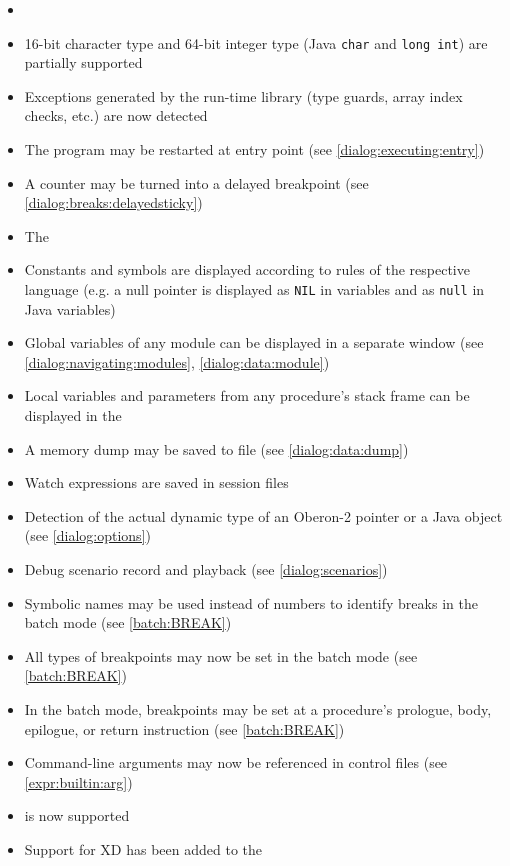\begin{itemize}
\item {}
\item 16-bit character type and 64-bit integer type (Java \verb'char' and 
      \verb'long int') are partially supported
\item Exceptions generated by the \XDS{} run-time library (type guards, 
      array index checks, etc.) are now detected
\item The program may be restarted at entry point
      (see \ref{dialog:executing:entry})
\item A counter may be turned into a delayed breakpoint 
      (see \ref{dialog:breaks:delayedsticky})
\item The 
\item Constants and symbols are displayed according to rules of the respective
      language (e.g. a null pointer is displayed as \verb'NIL' in \mt{} 
      variables and as \verb'null' in Java variables)
\item Global variables of any module can be displayed in a separate window
      (see \ref{dialog:navigating:modules}, \ref{dialog:data:module})
\item Local variables and parameters from any procedure's stack frame 
      can be displayed in the 
\item A memory dump may be saved to file (see \ref{dialog:data:dump})
\item Watch expressions are saved in session files
\item Detection of the actual dynamic type of an Oberon-2 pointer 
      or a Java object (see \ref{dialog:options})
\item Debug scenario record and playback (see \ref{dialog:scenarios})
\item Symbolic names may be used instead of numbers to identify breaks in 
      the batch mode (see \ref{batch:BREAK})
\item All types of breakpoints may now be set in the batch mode 
      (see \ref{batch:BREAK})
\item In the batch mode, breakpoints may be set at a procedure's 
      prologue, body, epilogue, or return instruction 
      (see \ref{batch:BREAK})
\item Command-line arguments may now be referenced in control files
      (see \ref{expr:builtin:arg})
\item {} is now supported
\item Support for XD has been added to the 
\end{itemize}

